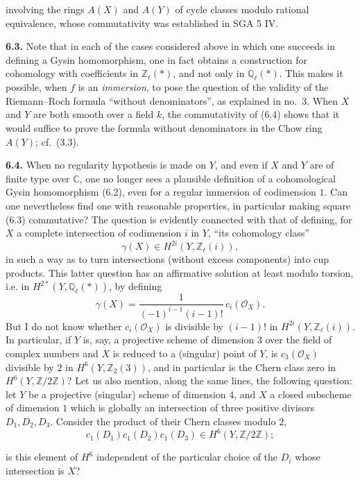 \documentclass[11pt]{article}
\newcommand{\C}{\mathbb C}
\newcommand{\Z}{\mathbb Z}
\newcommand{\Zell}{\mathbb Z_{\ell}}
\newcommand{\Qell}{\mathbb Q_{\ell}}
\begin{document}
involving the rings $A(X)$ and $A(Y)$ of cycle classes modulo rational
equivalence, whose commutativity was established in SGA 5 IV.

\noindent\textbf{6.3.}
Note that in each of the cases considered above in which one succeeds in
defining a Gysin homomorphism, one in fact obtains a construction for
cohomology with coefficients in $\Zell(*)$, and not only in $\Qell(*)$.
This makes it possible, when $f$ is an \emph{immersion}, to pose the question
of the validity of the Riemann--Roch formula ``without denominators'', as
explained in no.~3. When $X$ and $Y$ are both smooth over a field $k$, the
commutativity of (6.4) shows that it would suffice to prove the formula
without denominators in the Chow ring $A(Y)$; cf.~(3.3).

\noindent\textbf{6.4.}
When no regularity hypothesis is made on $Y$, and even if $X$ and $Y$ are of
finite type over $\C$, one no longer sees a plausible definition of a
cohomological Gysin homomorphism (6.2), even for a regular immersion of
codimension $1$. Can one nevertheless find one with reasonable properties,
in particular making square (6.3) commutative? The question is evidently
connected with that of defining, for $X$ a complete intersection of
codimension $i$ in $Y$, ``its cohomology class''
\[
 \gamma(X)\in H^{2i}(Y,\Zell(i)),
\]
in such a way as to turn intersections (without excess components) into cup
products. This latter question has an affirmative solution at least modulo
torsion, i.e. in $H^{2*}(Y,\Qell(*))$, by defining
\[
 \gamma(X)=\frac{1}{(-1)^{i-1}(i-1)!}\,c_i(\mathcal O_X).
\]
But I do not know whether $c_i(\mathcal O_X)$ is divisible by $(i-1)!$ in
$H^{2i}(Y,\Zell(i))$. In particular, if $Y$ is, say, a projective scheme of
dimension $3$ over the field of complex numbers and $X$ is reduced to a
(singular) point of $Y$, is $c_3(\mathcal O_X)$ divisible by $2$ in
$H^6(Y,\mathbb Z_2(3))$, and in particular is the Chern class zero in
$H^6(Y,\Z/2\Z)$? Let us also mention, along the same lines, the following
question: let $Y$ be a projective (singular) scheme of dimension $4$, and
$X$ a closed subscheme of dimension $1$ which is globally an intersection
of three positive divisors $D_1,D_2,D_3$. Consider the product of their
Chern classes modulo $2$,
\[
 c_1(D_1)c_1(D_2)c_1(D_3)\in H^6(Y,\Z/2\Z);
\]

is this element of $H^6$ independent of the particular choice of the $D_i$
whose intersection is $X$?
\end{document}
